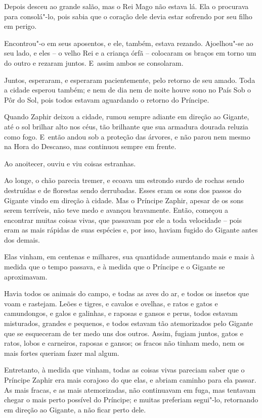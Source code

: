 Depois desceu ao grande salão, mas o Rei Mago não estava lá. Ela o
procurava para consolá"-lo, pois sabia que o coração dele devia estar
sofrendo por seu filho em perigo.

Encontrou"-o em seus aposentos, e ele, também, estava rezando.
Ajoelhou"-se ao seu lado, e eles -- o velho Rei e a criança órfã --
colocaram os braços em torno um do outro e rezaram juntos. E~assim ambos
se consolaram.


Juntos, esperaram, e esperaram pacientemente, pelo retorno de seu amado.
Toda a cidade esperou também; e nem de dia nem de noite houve sono no
País Sob o Pôr do Sol, pois todos estavam aguardando o retorno do
Príncipe.

Quando Zaphir deixou a cidade, rumou sempre adiante em direção ao
Gigante, até o sol brilhar alto nos céus, tão brilhante que sua armadura
dourada reluzia como fogo. E~então andou sob a proteção das árvores, e
não parou nem mesmo na Hora do Descanso, mas continuou sempre em frente.

Ao anoitecer, ouviu e viu coisas estranhas.

Ao longe, o chão parecia tremer, e ecoava um estrondo surdo de rochas
sendo destruídas e de florestas sendo derrubadas. Esses eram os sons dos
passos do Gigante vindo em direção à cidade. Mas o Príncipe Zaphir,
apesar de os sons serem terríveis, não teve medo e avançou bravamente.
Então, começou a encontrar muitas coisas vivas, que passavam por ele a
toda velocidade -- pois eram as mais rápidas de suas espécies e, por
isso, haviam fugido do Gigante antes dos demais.

Elas vinham, em centenas e milhares, sua quantidade aumentando mais e
mais à medida que o tempo passava, e à medida que o Príncipe e o Gigante
se aproximavam.

Havia todos os animais do campo, e todas as aves do ar, e todos os
insetos que voam e rastejam. Leões e tigres, e cavalos e ovelhas, e
ratos e gatos e camundongos, e galos e galinhas, e raposas e gansos e
perus, todos estavam misturados, grandes e pequenos, e todos estavam tão
atemorizados pelo Gigante que se esqueceram de ter medo uns dos outros.
Assim, fugiam juntos, gatos e ratos, lobos e carneiros, raposas e
gansos; os fracos não tinham medo, nem os mais fortes queriam fazer mal
algum.

Entretanto, à medida que vinham, todas as coisas vivas pareciam saber
que o Príncipe Zaphir era mais corajoso do que elas, e abriam caminho
para ela passar. As mais fracas, e as mais atemorizadas, não
continuavam em fuga, mas tentavam chegar o mais perto possível do
Príncipe; e muitas preferiam segui"-lo, retornando em direção ao Gigante,
a não ficar perto dele.

